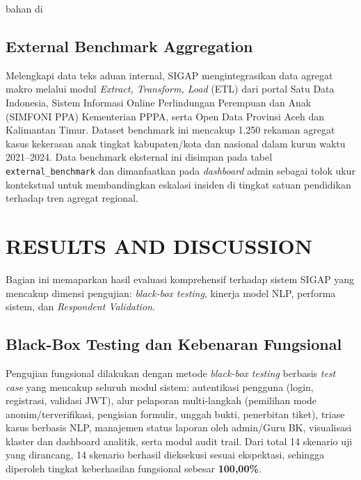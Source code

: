 bahan di\documentclass[conference]{IEEEtran}
\begin{document}
\subsection{External Benchmark Aggregation}

Melengkapi data teks aduan internal, SIGAP mengintegrasikan data agregat makro melalui modul \textit{Extract, Transform, Load} (ETL) dari portal Satu Data Indonesia, Sistem Informasi Online Perlindungan Perempuan dan Anak (SIMFONI PPA) Kementerian PPPA, serta Open Data Provinsi Aceh dan Kalimantan Timur. Dataset benchmark ini mencakup 1.250 rekaman agregat kasus kekerasan anak tingkat kabupaten/kota dan nasional dalam kurun waktu 2021--2024. Data benchmark eksternal ini disimpan pada tabel \texttt{external\_benchmark} dan dimanfaatkan pada \textit{dashboard} admin sebagai tolok ukur kontekstual untuk membandingkan eskalasi insiden di tingkat satuan pendidikan terhadap tren agregat regional.

\section{RESULTS AND DISCUSSION}

Bagian ini memaparkan hasil evaluasi komprehensif terhadap sistem SIGAP yang mencakup dimensi pengujian: \textit{black-box testing}, kinerja model NLP, performa sistem, dan \textit{Respondent Validation}.

\subsection{Black-Box Testing dan Kebenaran Fungsional}

Pengujian fungsional dilakukan dengan metode \textit{black-box testing} berbasis \textit{test case} yang mencakup seluruh modul sistem: autentikasi pengguna (login, registrasi, validasi JWT), alur pelaporan multi-langkah (pemilihan mode anonim/terverifikasi, pengisian formulir, unggah bukti, penerbitan tiket), triase kasus berbasis NLP, manajemen status laporan oleh admin/Guru BK, visualisasi klaster dan dashboard analitik, serta modul audit trail. Dari total 14 skenario uji yang dirancang, 14 skenario berhasil dieksekusi sesuai ekspektasi, sehingga diperoleh tingkat keberhasilan fungsional sebesar \textbf{100,00\%}.
\end{document}
